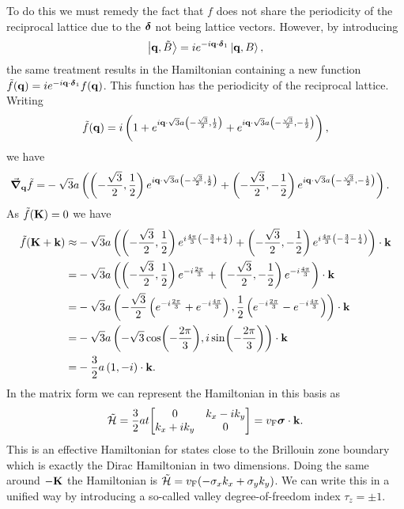 To do this we must remedy the fact that $f$ does not share the periodicity of the reciprocal lattice due to the $\vb*{\delta}$ not being lattice vectors. However, by introducing
\begin{align*}
	\ket{\vb{q}, \tilde{B}} = ie^{-i\vb{q}\cdot\vb*{\delta}_{1}}\ket{\vb{q}, B},
\end{align*}
the same treatment results in the Hamiltonian containing a new function $\tilde{f}(\vb{q}) = ie^{-i\vb{q}\cdot\vb*{\delta}_{1}}f(\vb{q})$. This function has the periodicity of the reciprocal lattice. Writing
\begin{align*}
	\tilde{f}(\vb{q}) = i\left(1 + e^{i\vb{q}\cdot\sqrt{3}a\left(-\frac{\sqrt{3}}{2}, \frac{1}{2}\right)} + e^{i\vb{q}\cdot\sqrt{3}a\left(-\frac{\sqrt{3}}{2}, -\frac{1}{2}\right)}\right),
\end{align*}
we have
\begin{align*}
	\grad_{\vb{q}}\tilde{f} =& -\sqrt{3}a\left(\left(-\frac{\sqrt{3}}{2}, \frac{1}{2}\right)e^{i\vb{q}\cdot\sqrt{3}a\left(-\frac{\sqrt{3}}{2}, \frac{1}{2}\right)} + \left(-\frac{\sqrt{3}}{2}, -\frac{1}{2}\right)e^{i\vb{q}\cdot\sqrt{3}a\left(-\frac{\sqrt{3}}{2}, -\frac{1}{2}\right)}\right).
\end{align*}
As $\tilde{f}(\vb{K}) = 0$ we have
\begin{align*}
	\tilde{f}(\vb{K} + \vb{k}) \approx& -\sqrt{3}a\left(\left(-\frac{\sqrt{3}}{2}, \frac{1}{2}\right)e^{i\frac{4\pi}{3}\left(-\frac{3}{4} + \frac{1}{4}\right)} + \left(-\frac{\sqrt{3}}{2}, -\frac{1}{2}\right)e^{i\frac{4\pi}{3}\left(-\frac{3}{4} - \frac{1}{4}\right)}\right)\cdot\vb{k} \\
	=& -\sqrt{3}a\left(\left(-\frac{\sqrt{3}}{2}, \frac{1}{2}\right)e^{-i\frac{2\pi}{3}} + \left(-\frac{\sqrt{3}}{2}, -\frac{1}{2}\right)e^{-i\frac{4\pi}{3}}\right)\cdot\vb{k} \\
	=& -\sqrt{3}a\left(-\frac{\sqrt{3}}{2}\left(e^{-i\frac{2\pi}{3}} + e^{-i\frac{4\pi}{3}}\right), \frac{1}{2}\left(e^{-i\frac{2\pi}{3}} - e^{-i\frac{4\pi}{3}}\right)\right)\cdot\vb{k} \\
	=& -\sqrt{3}a\left(-\sqrt{3}\cos(-\frac{2\pi}{3}), i\sin(-\frac{2\pi}{3})\right)\cdot\vb{k} \\
	=& -\frac{3}{2}a\left(1, -i\right)\cdot\vb{k}.
\end{align*}
In the matrix form we can represent the Hamiltonian in this basis as
\begin{align*}
	\tilde{\ham} = \frac{3}{2}at\mqty[
		0               & k_{x} - ik_{y} \\
		k_{x} + ik_{y}  & 0 \\
	] = v_{\text{F}}\vb*{\sigma}\cdot\vb{k}.
\end{align*}
This is an effective Hamiltonian for states close to the Brillouin zone boundary which is exactly the Dirac Hamiltonian in two dimensions. Doing the same around $-\vb{K}$ the Hamiltonian is $\tilde{\mathcal{H}} = v_{\text{F}}(-\sigma_{x}k_{x} + \sigma_{y}k_{y})$. We can write this in a unified way by introducing a so-called valley degree-of-freedom index $\tau_{z} = \pm 1$.

